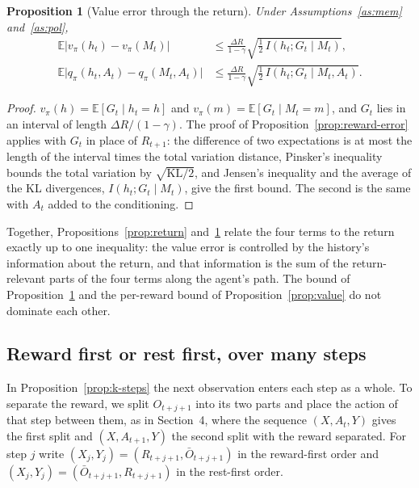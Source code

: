 \documentclass{article}
\newtheorem{proposition}{Proposition}
\theoremstyle{definition}
\theoremstyle{remark}
\newcommand{\E}{\mathbb{E}}
\newcommand{\Ob}{\bar O}
\begin{document}
\begin{proposition}[Value error through the return]\label{prop:value-return}
Under Assumptions~\ref{as:mem} and~\ref{as:pol},
\begin{align*}
\E\big|v_\pi(h_t)-v_\pi(M_t)\big|&\le\frac{\Delta R}{1-\gamma}\sqrt{\tfrac12\,I(h_t;G_t\mid M_t)},\\
\E\big|q_\pi(h_t,A_t)-q_\pi(M_t,A_t)\big|&\le\frac{\Delta R}{1-\gamma}\sqrt{\tfrac12\,I(h_t;G_t\mid M_t,A_t)}.
\end{align*}
\end{proposition}

\begin{proof}
$v_\pi(h)=\E[G_t\mid h_t=h]$ and $v_\pi(m)=\E[G_t\mid M_t=m]$, and $G_t$ lies in an interval of length $\Delta R/(1-\gamma)$. The proof of Proposition~\ref{prop:reward-error} applies with $G_t$ in place of $R_{t+1}$: the difference of two expectations is at most the length of the interval times the total variation distance, Pinsker's inequality bounds the total variation by $\sqrt{\mathrm{KL}/2}$, and Jensen's inequality and the average of the KL divergences, $I(h_t;G_t\mid M_t)$, give the first bound. The second is the same with $A_t$ added to the conditioning.
\end{proof}

Together, Propositions~\ref{prop:return} and~\ref{prop:value-return} relate the four terms to the return exactly up to one inequality: the value error is controlled by the history's information about the return, and that information is the sum of the return-relevant parts of the four terms along the agent's path. The bound of Proposition~\ref{prop:value-return} and the per-reward bound of Proposition~\ref{prop:value} do not dominate each other.

\subsection{Reward first or rest first, over many steps}

In Proposition~\ref{prop:k-steps} the next observation enters each step as a whole. To separate the reward, we split $O_{t+j+1}$ into its two parts and place the action of that step between them, as in Section~4, where the sequence $(X,A_t,Y)$ gives the first split and $(X,A_{t+1},Y)$ the second split with the reward separated. For step $j$ write $(X_j,Y_j)=(R_{t+j+1},\Ob_{t+j+1})$ in the reward-first order and $(X_j,Y_j)=(\Ob_{t+j+1},R_{t+j+1})$ in the rest-first order.
\end{document}
